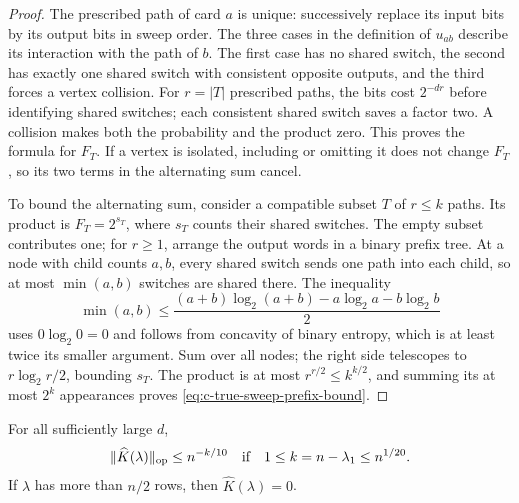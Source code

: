 \begin{proof}
The prescribed path of card $a$ is unique: successively replace its
input bits by its output bits in sweep order. The three cases in the
definition of $u_{ab}$ describe its interaction with the path of $b$.
The first case has no shared switch, the second has exactly one shared
switch with consistent opposite outputs, and the third forces a vertex
collision. For $r=|T|$ prescribed paths, the bits cost $2^{-dr}$
before identifying shared switches; each consistent shared switch saves
a factor two. A collision makes both the probability and the product
zero. This proves the formula for $F_T$. If a vertex is isolated,
including or omitting it does not change $F_T$, so its two terms in the
alternating sum cancel.

To bound the alternating sum, consider a compatible subset $T$ of
$r\le k$ paths. Its product is $F_T=2^{s_T}$, where $s_T$ counts
their shared switches. The empty subset contributes one; for $r\ge1$,
arrange the output words in a
binary prefix tree.  At a node with child counts $a,b$, every shared
switch sends one path into each child, so at most $\min(a,b)$ switches
are shared there.  The inequality
\[
 \min(a,b)\le\frac{(a+b)\log_2(a+b)-a\log_2a-b\log_2b}{2}
\]
uses $0\log_2 0=0$ and follows from concavity of binary entropy,
which is at least twice its smaller argument.  Sum over all nodes;
the right side telescopes to $r\log_2r/2$, bounding $s_T$. The product is at most
$r^{r/2}\le k^{k/2}$, and summing its at most $2^k$ appearances proves
\eqref{eq:c-true-sweep-prefix-bound}.
\end{proof}

\begin{proposition}
\label{prop:c-true-sweep-sparse}
For all sufficiently large $d$,
\begin{equation}
 \|\widehat K(\lambda)\|_{\rm op}\le n^{-k/10}
 \quad\hbox{if}\quad 1\le k=n-\lambda_1\le n^{1/20}.
 \label{eq:c-true-sweep-sparse}
\end{equation}
If $\lambda$ has more than $n/2$ rows, then
$\widehat K(\lambda)=0$.
\end{proposition}

